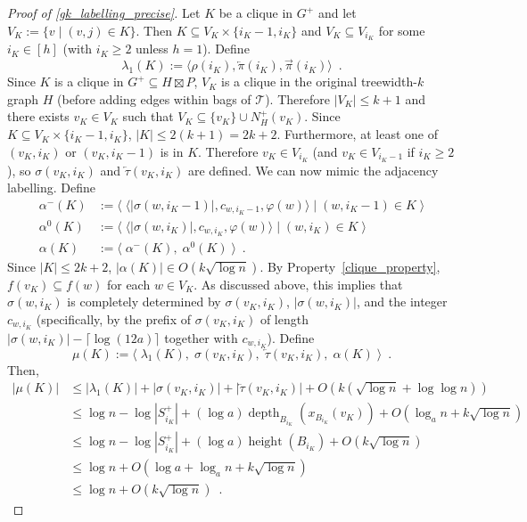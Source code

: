 \documentclass{patmorin}
\renewcommand{\ge}{\geqslant}
\renewcommand{\le}{\leqslant}
\DeclareMathOperator{\height}{height}
\DeclareMathOperator{\depth}{depth}
\newcommand{\Oh}{O}
\newcommand{\calT}{\mathcal{T}}
\begin{document}
\begin{proof}[Proof of \cref{gk_labelling_precise}]
  Let $K$ be a clique in $G^+$ and let $V_K:=\{v\mid (v,j)\in K\}$. Then $K\subseteq V_K\times\{i_K-1,i_K\}$ and $V_K\subseteq V_{i_K}$ for some $i_K\in[h]$ (with $i_K\ge 2$ unless $h=1$).  Define 
  \[
    \lambda_1(K):=\langle \rho(i_K), \overleftarrow{\pi}(i_K), \overrightarrow{\pi}(i_K)\rangle \enspace.
  \]    
  Since $K$ is a clique in $G^+\subseteq H\boxtimes P$, $V_K$ is a clique in the original treewidth-$k$ graph $H$ (before adding edges within bags of $\calT$).  Therefore $|V_K|\le k+1$ and there exists $v_K\in V_K$ such that $V_K\subseteq \{v_K\}\cup N^+_H(v_K)$.  Since $K\subseteq V_K\times\{i_K-1,i_K\}$, $|K|\le 2(k+1) = 2k+2$.  Furthermore, at least one of $(v_K,i_K)$ or $(v_K,i_K-1)$ is in $K$. Therefore $v_K\in V_{i_K}$ (and $v_K\in V_{i_K-1}$ if $i_K\ge 2$), so $\sigma(v_K, i_K)$ and $\overleftarrow{\tau}(v_K,i_K)$ are defined.  We can now mimic the adjacency labelling.  Define 
  \begin{align*}
    \alpha^-(K)
      & := \langle\; \langle |\sigma(w,i_K-1)|, c_{w,i_K-1}, \varphi(w)\rangle \mid (w,i_K-1)\in K \;\rangle \\
    \alpha^0(K)
      & := \langle\; \langle |\sigma(w,i_K)|, c_{w,i_K}, \varphi(w)\rangle \mid (w,i_K)\in K \;\rangle   \\
    \alpha(K)
      & := \langle\; \alpha^-(K),\; \alpha^0(K)  \;\rangle \enspace .
  \end{align*}
  Since $|K|\le 2k+2$, $|\alpha(K)|\in\Oh(k\sqrt{\log n})$.  By Property~\ref{clique_property}, $f(v_K) \subseteq f(w)$ for each $w \in V_K$. As discussed above, this implies that $\sigma(w,i_K)$ is completely determined by $\sigma(v_K,i_K)$, $|\sigma(w,i_K)|$, and the integer $c_{w,i_K}$ (specifically, by the prefix of $\sigma(v_K,i_K)$ of length $|\sigma(w,i_K)|-\lceil\log(12a)\rceil$ together with $c_{w,i_K}$). Define
  \[
    \mu(K) := \langle\; \lambda_1(K),\; \sigma(v_K,i_K),\; \overleftarrow{\tau}(v_K,i_K),\; \alpha(K) \;\rangle \enspace .
  \]
  Then,
  \begin{align*}
    |\mu(K)|
      & \le |\lambda_1(K)| + |\sigma(v_K,i_K)| + |\overleftarrow{\tau}(v_K,i_K)| + \Oh(k(\sqrt{\log n} + \log\log n)) \\
      & \le \log n - \log|S^+_{i_K}| + (\log a)\depth_{B_{i_K}}(x_{B_{i_K}}(v_K)) + \Oh(\log_a n + k\sqrt{\log n}) \\
      & \le \log n - \log|S^+_{i_K}| + (\log a)\height(B_{i_K}) + \Oh(k\sqrt{\log n}) \\
      & \le \log n + \Oh(\log a+ \log_a n + k\sqrt{\log n}) \\
      & \le \log n + \Oh(k\sqrt{\log n}) \enspace .
  \end{align*}


\end{proof}
\end{document}
